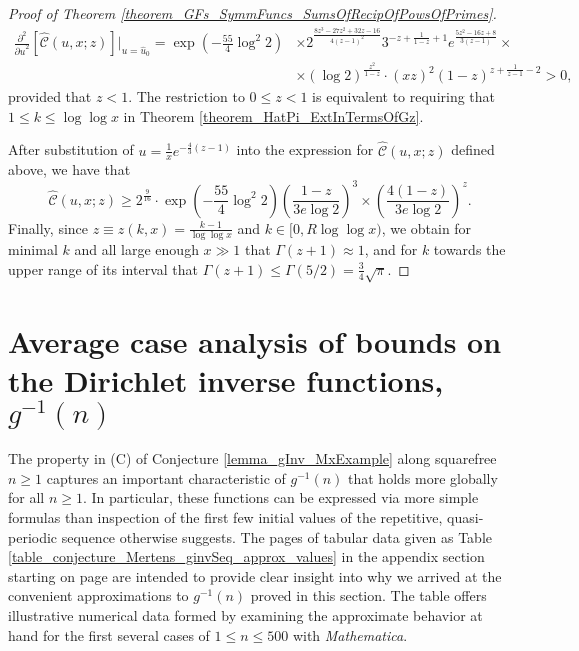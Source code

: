 \documentclass[11pt,reqno,a4letter]{article}
\numberwithin{figure}{section}
\numberwithin{table}{section}
\theoremstyle{plain}
\numberwithin{theorem}{section}
\theoremstyle{definition}
\begin{document}
\begin{proof}[Proof of Theorem \ref{theorem_GFs_SymmFuncs_SumsOfRecipOfPowsOfPrimes}]
\begin{align*}
\frac{\partial^2}{{\partial u}^2}\left[\widehat{\mathcal{C}}(u, x; z)\right] \Biggr\rvert_{u = \hat{u}_0} = 
     \exp\left(-\frac{55}{4} \log^2 2\right) & \times 2^{\frac{8 z^3-27 z^2+32 z-16}{4 (z-1)^2}} 
     3^{-z+\frac{1}{1-z}+1} e^{\frac{5 z^2-16 z+8}{3 (z-1)}} \times \\ 
     & \times (\log 2)^{\frac{z^2}{1-z}} \cdot (xz)^2 (1-z)^{z+\frac{1}{z-1}-2} > 0, 
\end{align*} 
provided that $z < 1$. 
The restriction to $0 \leq z < 1$ is equivalent to requiring that 
$1 \leq k \leq \log\log x$ in Theorem \ref{theorem_HatPi_ExtInTermsOfGz}. 

After substitution of $u = \frac{1}{x} e^{-\frac{4}{3}(z-1)}$ into the expression for 
$\widehat{\mathcal{C}}(u, x; z)$ defined above, we have that 
\[
\widehat{\mathcal{C}}(u, x; z) \geq  2^{\frac{9}{16}} \cdot \exp\left(-\frac{55}{4} \log^2 2\right) 
     \left(\frac{1-z}{3e\log 2}\right)^3 \times \left(\frac{4(1-z)}{3e\log 2}\right)^z. 
\]
Finally, since $z \equiv z(k, x) = \frac{k-1}{\log\log x}$ and $k \in [0, R\log\log x)$, we obtain 
for minimal $k$ and all large enough $x \gg 1$ that 
$\Gamma(z+1) \approx 1$, and for $k$ towards the upper range of 
its interval that $\Gamma(z+1) \leq \Gamma(5/2) = \frac{3}{4} \sqrt{\pi}$. 
\end{proof} 

\newpage
\section{Average case analysis of bounds on the Dirichlet inverse functions, $g^{-1}(n)$} 
\label{Section_InvFunc_PreciseExpsAndAsymptotics} 

The property in (C) of 
Conjecture \ref{lemma_gInv_MxExample} along squarefree $n \geq 1$ 
captures an important characteristic of $g^{-1}(n)$ that holds more globally 
for all $n \geq 1$. In particular, these 
functions can be expressed via more simple formulas than inspection of the 
first few initial values of the repetitive, quasi-periodic sequence otherwise suggests. 
The pages of tabular data given as Table \ref{table_conjecture_Mertens_ginvSeq_approx_values} 
in the appendix section starting on 
page \pageref{table_conjecture_Mertens_ginvSeq_approx_values} are intended to 
provide clear insight into why we arrived at the convenient approximations to 
$g^{-1}(n)$ proved in this section. The table offers illustrative 
numerical data formed by examining the approximate behavior 
at hand for the first several cases of $1 \leq n \leq 500$ with \emph{Mathematica}. 
\end{document}
